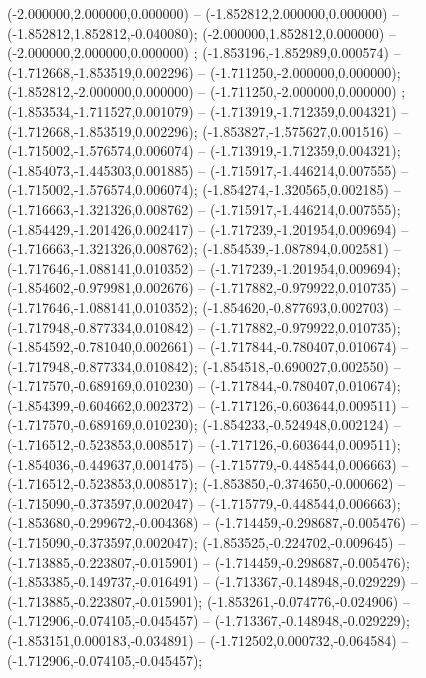  (-2.000000,2.000000,0.000000) -- (-1.852812,2.000000,0.000000) -- (-1.852812,1.852812,-0.040080);
 (-2.000000,1.852812,0.000000) -- (-2.000000,2.000000,0.000000) ;
 (-1.853196,-1.852989,0.000574) -- (-1.712668,-1.853519,0.002296) -- (-1.711250,-2.000000,0.000000);
 (-1.852812,-2.000000,0.000000) -- (-1.711250,-2.000000,0.000000) ;
 (-1.853534,-1.711527,0.001079) -- (-1.713919,-1.712359,0.004321) -- (-1.712668,-1.853519,0.002296);
 (-1.853827,-1.575627,0.001516) -- (-1.715002,-1.576574,0.006074) -- (-1.713919,-1.712359,0.004321);
 (-1.854073,-1.445303,0.001885) -- (-1.715917,-1.446214,0.007555) -- (-1.715002,-1.576574,0.006074);
 (-1.854274,-1.320565,0.002185) -- (-1.716663,-1.321326,0.008762) -- (-1.715917,-1.446214,0.007555);
 (-1.854429,-1.201426,0.002417) -- (-1.717239,-1.201954,0.009694) -- (-1.716663,-1.321326,0.008762);
 (-1.854539,-1.087894,0.002581) -- (-1.717646,-1.088141,0.010352) -- (-1.717239,-1.201954,0.009694);
 (-1.854602,-0.979981,0.002676) -- (-1.717882,-0.979922,0.010735) -- (-1.717646,-1.088141,0.010352);
 (-1.854620,-0.877693,0.002703) -- (-1.717948,-0.877334,0.010842) -- (-1.717882,-0.979922,0.010735);
 (-1.854592,-0.781040,0.002661) -- (-1.717844,-0.780407,0.010674) -- (-1.717948,-0.877334,0.010842);
 (-1.854518,-0.690027,0.002550) -- (-1.717570,-0.689169,0.010230) -- (-1.717844,-0.780407,0.010674);
 (-1.854399,-0.604662,0.002372) -- (-1.717126,-0.603644,0.009511) -- (-1.717570,-0.689169,0.010230);
 (-1.854233,-0.524948,0.002124) -- (-1.716512,-0.523853,0.008517) -- (-1.717126,-0.603644,0.009511);
 (-1.854036,-0.449637,0.001475) -- (-1.715779,-0.448544,0.006663) -- (-1.716512,-0.523853,0.008517);
 (-1.853850,-0.374650,-0.000662) -- (-1.715090,-0.373597,0.002047) -- (-1.715779,-0.448544,0.006663);
 (-1.853680,-0.299672,-0.004368) -- (-1.714459,-0.298687,-0.005476) -- (-1.715090,-0.373597,0.002047);
 (-1.853525,-0.224702,-0.009645) -- (-1.713885,-0.223807,-0.015901) -- (-1.714459,-0.298687,-0.005476);
 (-1.853385,-0.149737,-0.016491) -- (-1.713367,-0.148948,-0.029229) -- (-1.713885,-0.223807,-0.015901);
 (-1.853261,-0.074776,-0.024906) -- (-1.712906,-0.074105,-0.045457) -- (-1.713367,-0.148948,-0.029229);
 (-1.853151,0.000183,-0.034891) -- (-1.712502,0.000732,-0.064584) -- (-1.712906,-0.074105,-0.045457);
